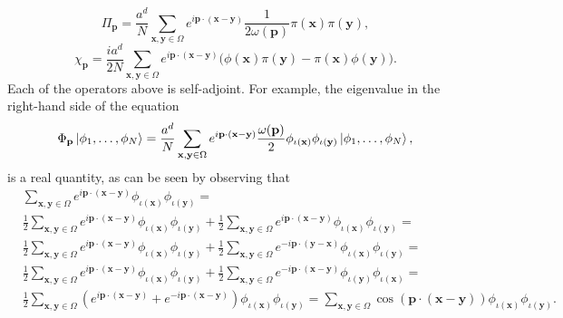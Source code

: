 \documentclass[a4paper,10pt]{report}
\begin{document}
\begin{equation}
\Pi_\mathbf{p} = \frac{a^d}{N}\sum_{\mathbf{x},\mathbf{y}\in\Omega}e^{i\mathbf{p}\cdot(\mathbf{x}-\mathbf{y})}\frac{1}{2\omega(\mathbf{p})}\pi(\mathbf{x})\pi(\mathbf{y}),
\label{eq:meas_pi}
\end{equation}
\begin{equation}
\chi_\mathbf{p} = \frac{ia^d}{2N}\sum_{\mathbf{x},\mathbf{y}\in\Omega}e^{i\mathbf{p}\cdot(\mathbf{x}-\mathbf{y})}\big(\phi(\mathbf{x})\pi(\mathbf{y})-\pi(\mathbf{x})\phi(\mathbf{y})\big).
\end{equation}
Each of the operators above is self-adjoint. For example, the eigenvalue in the right-hand side of the equation
\begin{equation}
\Phi_\mathbf{p}\ket{\phi_1,\dots,\phi_N} = \frac{a^d}{N}\sum_{\mathbf{x},\mathbf{y}\in\Omega}e^{i\mathbf{p}\cdot(\mathbf{x}-\mathbf{y})}\frac{\omega(\mathbf{p})}{2}\phi_{\iota(\mathbf{x})}\phi_{\iota(\mathbf{y})}\ket{\phi_1,\dots,\phi_N},
\end{equation}
is a real quantity, as can be seen by observing that
\begin{align}
&\sum_{\mathbf{x},\mathbf{y}\in\Omega}e^{i\mathbf{p}\cdot(\mathbf{x}-\mathbf{y})}\phi_{\iota(\mathbf{x})}\phi_{\iota(\mathbf{y})} = \nonumber\\
&\frac{1}{2}\sum_{\mathbf{x},\mathbf{y}\in\Omega}e^{i\mathbf{p}\cdot(\mathbf{x}-\mathbf{y})}\phi_{\iota(\mathbf{x})}\phi_{\iota(\mathbf{y})} + \frac{1}{2}\sum_{\mathbf{x},\mathbf{y}\in\Omega}e^{i\mathbf{p}\cdot(\mathbf{x}-\mathbf{y})}\phi_{\iota(\mathbf{x})}\phi_{\iota(\mathbf{y})} = \nonumber\\
&\frac{1}{2}\sum_{\mathbf{x},\mathbf{y}\in\Omega}e^{i\mathbf{p}\cdot(\mathbf{x}-\mathbf{y})}\phi_{\iota(\mathbf{x})}\phi_{\iota(\mathbf{y})} + \frac{1}{2}\sum_{\mathbf{x},\mathbf{y}\in\Omega}e^{-i\mathbf{p}\cdot(\mathbf{y}-\mathbf{x})}\phi_{\iota(\mathbf{x})}\phi_{\iota(\mathbf{y})} = \nonumber\\
&\frac{1}{2}\sum_{\mathbf{x},\mathbf{y}\in\Omega}e^{i\mathbf{p}\cdot(\mathbf{x}-\mathbf{y})}\phi_{\iota(\mathbf{x})}\phi_{\iota(\mathbf{y})} + \frac{1}{2}\sum_{\mathbf{x},\mathbf{y}\in\Omega}e^{-i\mathbf{p}\cdot(\mathbf{x}-\mathbf{y})}\phi_{\iota(\mathbf{y})}\phi_{\iota(\mathbf{x})} = \nonumber\\
&\frac{1}{2}\sum_{\mathbf{x},\mathbf{y}\in\Omega}(e^{i\mathbf{p}\cdot(\mathbf{x}-\mathbf{y})}+e^{-i\mathbf{p}\cdot(\mathbf{x}-\mathbf{y})})\phi_{\iota(\mathbf{x})}\phi_{\iota(\mathbf{y})} = \sum_{\mathbf{x},\mathbf{y}\in\Omega}\cos(\mathbf{p}\cdot(\mathbf{x}-\mathbf{y}))\phi_{\iota(\mathbf{x})}\phi_{\iota(\mathbf{y})}.
\end{align}
\end{document}
